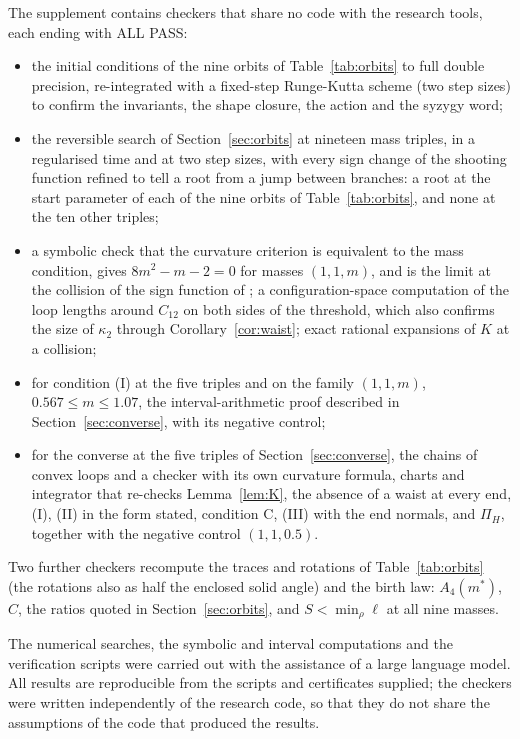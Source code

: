 \documentclass[11pt]{article}
\theoremstyle{definition}
\begin{document}
The supplement contains checkers that share no code with the research tools, each ending with ALL PASS:
\begin{itemize}
\item the initial conditions of the nine orbits of Table~\ref{tab:orbits} to full double precision, re-integrated with
a fixed-step Runge-Kutta scheme (two step sizes) to confirm the invariants, the shape closure, the action and the
syzygy word;
\item the reversible search of Section~\ref{sec:orbits} at nineteen mass triples, in a regularised time and at two
step sizes, with
every sign change of the shooting function refined to tell a root from a jump between branches: a root at the start
parameter of each of the nine orbits of Table~\ref{tab:orbits}, and none at the ten other triples;
\item a symbolic check that the curvature criterion is equivalent to the mass condition, gives $8m^2-m-2=0$ for masses
$(1,1,m)$, and is the limit at the collision of the sign function of \cite[(7.13)]{M05}; a configuration-space
computation of the loop lengths around $C_{12}$ on both sides of the threshold, which also confirms the size of
$\kappa_2$ through Corollary~\ref{cor:waist}; exact rational expansions of $K$ at a collision;
\item for condition (I) at the five triples and on the family $(1,1,m)$, $0.567\le m\le1.07$, the
interval-arithmetic proof described in Section~\ref{sec:converse}, with its negative control;
\item for the converse at the five triples of Section~\ref{sec:converse}, the chains of convex loops and a checker with
its own curvature formula, charts and integrator that re-checks Lemma~\ref{lem:K}, the absence of a waist at every
end, (I), (II) in the form stated, condition C, (III) with the end normals, and $\Pi_H$, together with the negative
control $(1,1,0.5)$.
\end{itemize}
Two further checkers recompute the traces and rotations of Table~\ref{tab:orbits} (the rotations also as half the
enclosed solid angle) and the birth law: $A_4(m^*)$, $C$, the ratios quoted in Section~\ref{sec:orbits}, and
$S<\min_\rho\ell$ at all nine masses.

The numerical searches, the symbolic and interval computations and the verification scripts were carried out with the
assistance of a large language model. All results are reproducible from the scripts and certificates supplied; the
checkers were written independently of the research code, so that they do not share the assumptions of the code that
produced the results.
\end{document}
